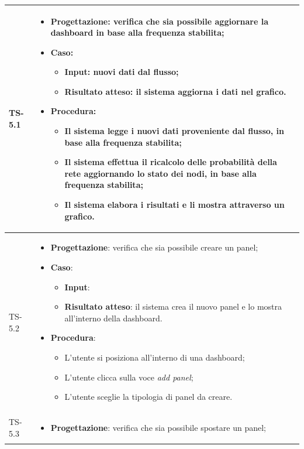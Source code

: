 \begin{longtable}{|C{2.5cm}|C{13cm}|}
	\\
	\hline
	{TS-5.1} & 
\begin{itemize}
	\item \textbf{Progettazione}: verifica che sia possibile aggiornare la
	dashboard in base alla frequenza stabilita;
	\item \textbf{Caso}: 
	\begin{itemize}
		\item \textbf{Input}: nuovi dati dal flusso;
		\item \textbf{Risultato atteso}: il sistema aggiorna i dati nel grafico.
	\end{itemize}
	\item \textbf{Procedura}:
	\begin{itemize}
		\item Il sistema legge i nuovi dati proveniente dal flusso, in base alla frequenza stabilita;
		\item Il sistema effettua il ricalcolo delle probabilità della rete aggiornando lo stato dei nodi, in base alla frequenza stabilita;
		\item Il sistema elabora i risultati e li mostra attraverso un grafico.
	\end{itemize} 
\end{itemize}
\\
	\hline
	{TS-5.2} & 
\begin{itemize}
	\item \textbf{Progettazione}: verifica che sia possibile creare un panel;
	\item \textbf{Caso}: 
	\begin{itemize}
		\item \textbf{Input}: 
		\item \textbf{Risultato atteso}: il sistema crea il nuovo panel e lo mostra all'interno della dashboard.
	\end{itemize}
	\item \textbf{Procedura}:
	\begin{itemize}
		\item L'utente si posiziona all'interno di una dashboard;
		\item L'utente clicca sulla voce \emph{add panel};
		\item L'utente sceglie la tipologia di panel da creare.
	\end{itemize} 
\end{itemize}
 \\
	\hline
	{TS-5.3} & 
\begin{itemize}
	\item \textbf{Progettazione}: verifica che sia possibile spostare un panel;

\end{itemize}
\end{longtable}

